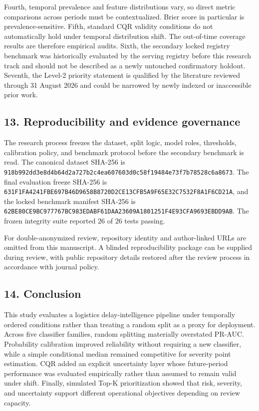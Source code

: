 \documentclass[
]{article}
\begin{document}
Fourth, temporal prevalence and feature distributions vary, so direct
metric comparisons across periods must be contextualized. Brier score in
particular is prevalence-sensitive. Fifth, standard CQR validity
conditions do not automatically hold under temporal distribution shift.
The out-of-time coverage results are therefore empirical audits. Sixth,
the secondary locked registry benchmark was historically evaluated by
the serving registry before this research track and should not be
described as a newly untouched confirmatory holdout. Seventh, the
Level-2 priority statement is qualified by the literature reviewed
through 31 August 2026 and could be narrowed by newly indexed or
inaccessible prior work.

\subsection{13. Reproducibility and evidence
governance}\label{reproducibility-and-evidence-governance}

The research process freezes the dataset, split logic, model roles,
thresholds, calibration policy, and benchmark protocol before the
secondary benchmark is read. The canonical dataset SHA-256 is
\texttt{918b992dd3e8d4b64d2a727b2c4ea607603d0c58f19484e73f7b78528c6a8673}.
The final evaluation freeze SHA-256 is
\texttt{631F1FA4241FBE697B46D9658B8720D2CE13CFB5A9F65E32C7532F8A1F6CD21A},
and the locked benchmark manifest SHA-256 is
\texttt{62BE80CE9BC977767BC983EDABF61DAA23609A1801251F4E93CFA9693EBDD9AB}.
The frozen integrity suite reported 26 of 26 tests passing.

For double-anonymized review, repository identity and author-linked URLs
are omitted from this manuscript. A blinded reproducibility package can
be supplied during review, with public repository details restored after
the review process in accordance with journal policy.

\subsection{14. Conclusion}\label{conclusion}

This study evaluates a logistics delay-intelligence pipeline under
temporally ordered conditions rather than treating a random split as a
proxy for deployment. Across five classifier families, random splitting
materially overstated PR-AUC. Probability calibration improved
reliability without requiring a new classifier, while a simple
conditional median remained competitive for severity point estimation.
CQR added an explicit uncertainty layer whose future-period performance
was evaluated empirically rather than assumed to remain valid under
shift. Finally, simulated Top-K prioritization showed that risk,
severity, and uncertainty support different operational objectives
depending on review capacity.
\end{document}
